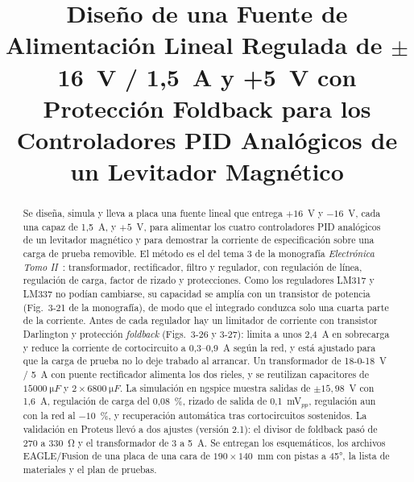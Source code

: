 \documentclass[conference]{IEEEtran}
\begin{document}
\title{Diseño de una Fuente de Alimentación Lineal Regulada de $\pm$16~V / 1,5~A y +5~V con Protección Foldback para los Controladores PID Analógicos de un Levitador Magnético}

\author{
}

\maketitle

\begin{abstract}
Se diseña, simula y lleva a placa una fuente lineal que entrega $+16$~V y $-16$~V, cada una capaz de 1,5~A, y $+5$~V, para alimentar los cuatro controladores PID analógicos de un levitador magnético y para demostrar la corriente de especificación sobre una carga de prueba removible. El método es el del tema 3 de la monografía \emph{Electrónica Tomo II}~\cite{monografia}: transformador, rectificador, filtro y regulador, con regulación de línea, regulación de carga, factor de rizado y protecciones. Como los reguladores LM317 y LM337 no podían cambiarse, su capacidad se amplía con un transistor de potencia (Fig.~3-21 de la monografía), de modo que el integrado conduzca solo una cuarta parte de la corriente. Antes de cada regulador hay un limitador de corriente con transistor Darlington y protección \emph{foldback} (Figs.~3-26 y 3-27): limita a unos 2,4~A en sobrecarga y reduce la corriente de cortocircuito a 0,3--0,9~A según la red, y está ajustado para que la carga de prueba no lo deje trabado al arrancar. Un transformador de 18-0-18~V / 5~A con puente rectificador alimenta los dos rieles, y se reutilizan capacitores de $\SI{15000}{\micro F}$ y $2\times\SI{6800}{\micro F}$. La simulación en ngspice muestra salidas de $\pm15{,}98$~V con 1,6~A, regulación de carga del 0,08~\%, rizado de salida de 0,1~mV$_{pp}$, regulación aun con la red al $-10$~\%, y recuperación automática tras cortocircuitos sostenidos. La validación en Proteus llevó a dos ajustes (versión 2.1): el divisor de foldback pasó de 270 a \SI{330}{\ohm} y el transformador de 3 a 5~A. Se entregan los esquemáticos, los archivos EAGLE/Fusion de una placa de una cara de $190\times140$~mm con pistas a 45°, la lista de materiales y el plan de pruebas.
\end{abstract}
\end{document}
